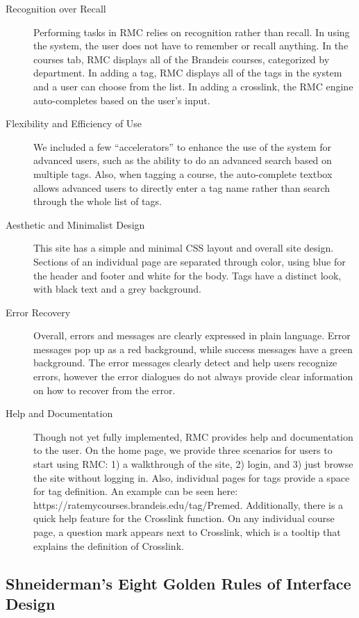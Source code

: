 \documentclass[12pt]{report}
\begin{document}
\begin{description}
\item[Recognition over Recall] Performing tasks in RMC relies on recognition rather than recall. In using the system, the user does not have to remember or recall anything. In the courses tab, RMC displays all of the Brandeis courses, categorized by department. In adding a tag, RMC displays all of the tags in the system and a user can choose from the list. In adding a crosslink, the RMC engine auto-completes based on the user’s input.
\item[Flexibility and Efficiency of Use] We included a few “accelerators” to enhance the use of the system for advanced users, such as the ability to do an advanced search based on multiple tags. Also, when tagging a course, the auto-complete textbox allows advanced users to directly enter a tag name rather than search through the whole list of tags.
\item[Aesthetic and Minimalist Design] This site has a simple and minimal CSS layout and overall site design. Sections of an individual page are separated through color, using blue for the header and footer and white for the body. Tags have a distinct look, with black text and a grey background.
\item [Error Recovery] Overall, errors and messages are clearly expressed in plain language. Error messages pop up as a red background, while success messages have a green background. The error messages clearly detect and help users recognize errors, however the error dialogues do not always provide clear information on how to recover from the error.
\item[Help and Documentation] Though not yet fully implemented, RMC provides help and documentation to the user.  On the home page, we provide three scenarios for users to start using RMC: 1) a walkthrough of the site, 2) login, and 3) just browse the site without logging in. Also, individual pages for tags provide a space for tag definition. An example can be seen here: https://ratemycourses.brandeis.edu/tag/Premed. Additionally, there is a quick help feature for the Crosslink function. On any individual course page, a question mark appears next to Crosslink, which is a tooltip that explains the definition of Crosslink.
\end{description}


\subsection{Shneiderman’s Eight Golden Rules of Interface Design}
\end{document}
